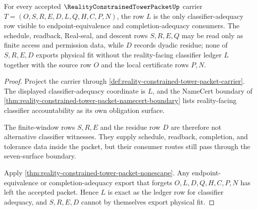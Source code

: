 \begin{theorem}
\label{thm:reality-constrained-tower-packet-classifier-ledger-exactness}
For every accepted $\RealityConstrainedTowerPacketUp$ carrier $T=(O,S,R,E,D,L,Q,H,C,P,N)$, the row $L$ is the only classifier-adequacy row visible to endpoint-equivalence and completion-adequacy consumers. The schedule, readback, Real-seal, and descent rows $S,R,E,Q$ may be read only as finite access and permission data, while $D$ records dyadic residue; none of $S,R,E,D$ exports physical fit without the reality-facing classifier ledger $L$ together with the source row $O$ and the local certificate rows $P,N$.
\end{theorem}
\begin{proof}
Project the carrier through \autoref{def:reality-constrained-tower-packet-carrier}. The displayed classifier-adequacy coordinate is $L$, and the NameCert boundary of \autoref{thm:reality-constrained-tower-packet-namecert-boundary} lists reality-facing classifier accountability as its own obligation surface.

The finite-window rows $S,R,E$ and the residue row $D$ are therefore not alternative classifier witnesses. They supply schedule, readback, completion, and tolerance data inside the packet, but their consumer routes still pass through the seven-surface boundary.

Apply \autoref{thm:reality-constrained-tower-packet-nonescape}. Any endpoint-equivalence or completion-adequacy export that forgets $O,L,D,Q,H,C,P,N$ has left the accepted packet. Hence $L$ is exact as the ledger row for classifier adequacy, and $S,R,E,D$ cannot by themselves export physical fit.
\end{proof}

